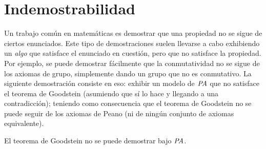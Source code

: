 \section{Indemostrabilidad}
\label{indemostrabilidad}
Un trabajo común en matemáticas es demostrar que una propiedad no se sigue de ciertos enunciados. Este tipo de demostraciones suelen llevarse a cabo exhibiendo un \textit{algo} que satisface el enunciado en cuestión, pero que no satisface la propiedad. Por ejemplo, se puede demostrar fácilmente que la conmutatividad no se sigue de los axiomas de grupo, simplemente dando un grupo que no es conmutativo. La siguiente demostración consiste en eso: exhibir un modelo de $\textit{PA}$ que no satisface el teorema de Goodstein (asumiendo que sí lo hace y llegando a una contradicción); teniendo como consecuencia que el teorema de Goodstein no se puede seguir de los axiomas de Peano (ni de ningún conjunto de axiomas equivalente).
\begin{thm}
    El teorema de Goodstein no se puede demostrar bajo $\textit{PA}$.
\end{thm}
